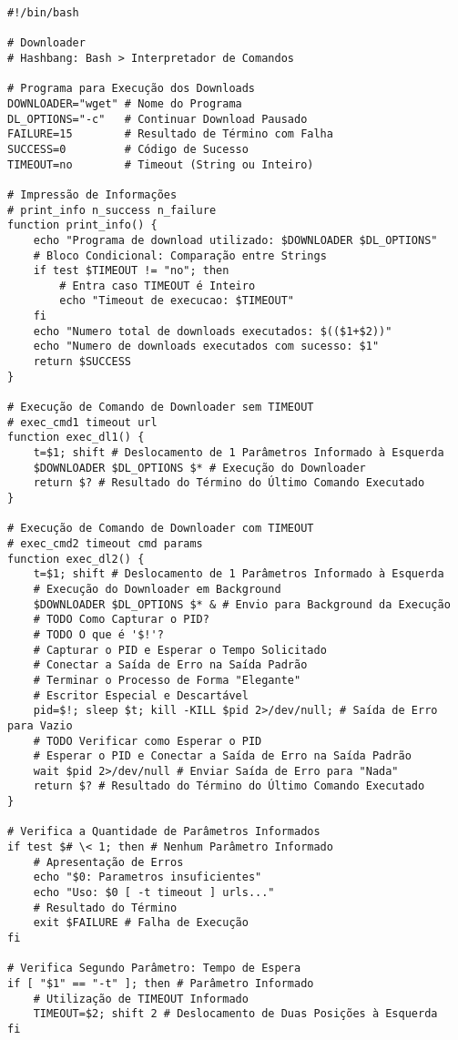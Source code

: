\documentclass{article}
\begin{document}
\small
\begin{verbatim}
#!/bin/bash

# Downloader
# Hashbang: Bash > Interpretador de Comandos

# Programa para Execução dos Downloads
DOWNLOADER="wget" # Nome do Programa
DL_OPTIONS="-c"   # Continuar Download Pausado
FAILURE=15        # Resultado de Término com Falha
SUCCESS=0         # Código de Sucesso
TIMEOUT=no        # Timeout (String ou Inteiro)

# Impressão de Informações
# print_info n_success n_failure
function print_info() {
    echo "Programa de download utilizado: $DOWNLOADER $DL_OPTIONS"
    # Bloco Condicional: Comparação entre Strings
    if test $TIMEOUT != "no"; then
        # Entra caso TIMEOUT é Inteiro
        echo "Timeout de execucao: $TIMEOUT"
    fi
    echo "Numero total de downloads executados: $(($1+$2))"
    echo "Numero de downloads executados com sucesso: $1"
    return $SUCCESS
}

# Execução de Comando de Downloader sem TIMEOUT
# exec_cmd1 timeout url
function exec_dl1() {
    t=$1; shift # Deslocamento de 1 Parâmetros Informado à Esquerda
    $DOWNLOADER $DL_OPTIONS $* # Execução do Downloader
    return $? # Resultado do Término do Último Comando Executado
}

# Execução de Comando de Downloader com TIMEOUT
# exec_cmd2 timeout cmd params
function exec_dl2() {
    t=$1; shift # Deslocamento de 1 Parâmetros Informado à Esquerda
    # Execução do Downloader em Background
    $DOWNLOADER $DL_OPTIONS $* & # Envio para Background da Execução
    # TODO Como Capturar o PID?
    # TODO O que é '$!'?
    # Capturar o PID e Esperar o Tempo Solicitado
    # Conectar a Saída de Erro na Saída Padrão
    # Terminar o Processo de Forma "Elegante"
    # Escritor Especial e Descartável
    pid=$!; sleep $t; kill -KILL $pid 2>/dev/null; # Saída de Erro para Vazio
    # TODO Verificar como Esperar o PID
    # Esperar o PID e Conectar a Saída de Erro na Saída Padrão
    wait $pid 2>/dev/null # Enviar Saída de Erro para "Nada"
    return $? # Resultado do Término do Último Comando Executado
}

# Verifica a Quantidade de Parâmetros Informados
if test $# \< 1; then # Nenhum Parâmetro Informado
    # Apresentação de Erros
    echo "$0: Parametros insuficientes"
    echo "Uso: $0 [ -t timeout ] urls..."
    # Resultado do Término
    exit $FAILURE # Falha de Execução
fi

# Verifica Segundo Parâmetro: Tempo de Espera
if [ "$1" == "-t" ]; then # Parâmetro Informado
    # Utilização de TIMEOUT Informado
    TIMEOUT=$2; shift 2 # Deslocamento de Duas Posições à Esquerda
fi


\end{verbatim}
\end{document}
